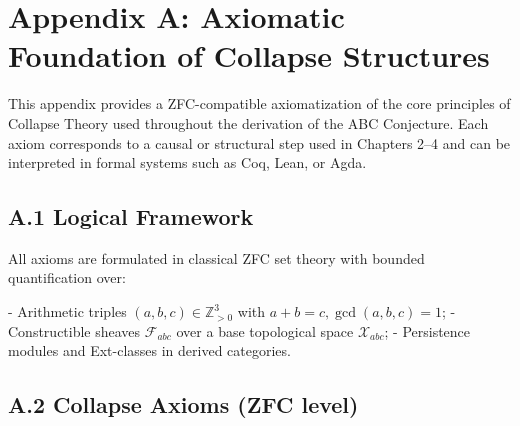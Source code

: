 \documentclass[11pt]{article}
\begin{document}
\appendix
\section*{Appendix A: Axiomatic Foundation of Collapse Structures}

This appendix provides a ZFC-compatible axiomatization of the core principles of Collapse Theory  
used throughout the derivation of the ABC Conjecture. Each axiom corresponds to a causal or structural step  
used in Chapters 2–4 and can be interpreted in formal systems such as Coq, Lean, or Agda.

\subsection*{A.1 Logical Framework}

All axioms are formulated in classical ZFC set theory with bounded quantification over:

- Arithmetic triples \( (a,b,c) \in \mathbb{Z}_{>0}^3 \) with \( a + b = c, \gcd(a,b,c)=1 \);
- Constructible sheaves \( \mathcal{F}_{abc} \) over a base topological space \( \mathcal{X}_{abc} \);
- Persistence modules and Ext-classes in derived categories.

\subsection*{A.2 Collapse Axioms (ZFC level)}
\end{document}
